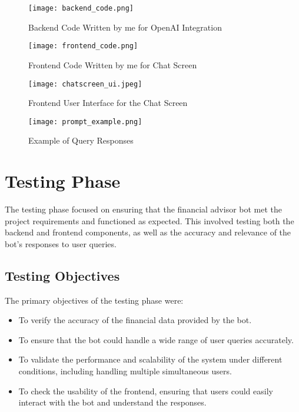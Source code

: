 \documentclass[a4paper,12pt]{report}
\begin{document}
\begin{figure}[H]
    \centering
    \texttt{[image: backend\_code.png]}
    \caption{Backend Code Written by me for OpenAI Integration}
    \label{fig:api-integration}
\end{figure}

\begin{figure}[H]
    \centering
    \texttt{[image: frontend\_code.png]}
    \caption{Frontend Code Written by me for Chat Screen}
    \label{fig:api-integration}
\end{figure}

\begin{figure}[H]
    \centering
    \texttt{[image: chatscreen\_ui.jpeg]}
    \caption{Frontend User Interface for the Chat Screen}
    \label{fig:frontend-ui}
\end{figure}

\begin{figure}[H]
    \centering
    \texttt{[image: prompt\_example.png]}
    \caption{Example of Query Responses}
    \label{fig:prompt-engineering}
\end{figure}


\section{Testing Phase}
The testing phase focused on ensuring that the financial advisor bot met the project requirements and functioned as expected. This involved testing both the backend and frontend components, as well as the accuracy and relevance of the bot's responses to user queries.

\subsection*{Testing Objectives}
The primary objectives of the testing phase were:
\begin{itemize}
    \item To verify the accuracy of the financial data provided by the bot.
    \item To ensure that the bot could handle a wide range of user queries accurately.
    \item To validate the performance and scalability of the system under different conditions, including handling multiple simultaneous users.
    \item To check the usability of the frontend, ensuring that users could easily interact with the bot and understand the responses.
\end{itemize}
\end{document}
